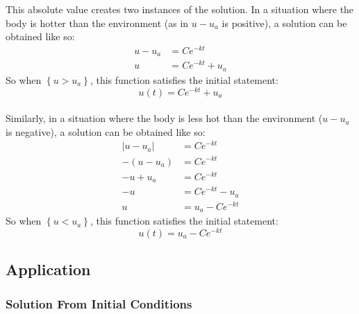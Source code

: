 \documentclass[10pt]{article}
\begin{document}
This absolute value creates two instances of  the solution. In a situation where the body is hotter than the environment (as in $u-u_{a}$ is positive), a solution can be obtained like so:
	\begin{align*}
	u-u_{a} &= Ce^{-kt}\\
	u &= Ce^{-kt}+u_{a}
	\end{align*}
So when $\left \lbrace  u > u_a \right \rbrace $, this function satisfies the initial statement:
	\begin{equation}
	\label{eq:6}
	u(t) = Ce^{-kt}+u_{a}
	\end{equation} \\
Similarly, in a situation where the body is less hot than the environment ($u-u_{a}$ is negative), a solution can be obtained like so:
	\begin{align*}
	\Big| u-u_{a} \Big| &= Ce^{-kt}\\
	-(u- u_{a}) &= Ce^{-kt}\\
	-u+u_{a} &= Ce^{-kt}\\
	-u &= Ce^{-kt}-u_{a}\\
	u &=u_{a}-Ce^{-kt}
	\end{align*}
So when $\left \lbrace  u < u_a \right \rbrace $, this function satisfies the initial statement:
	\begin{equation}
	u(t) =u_{a}-Ce^{-kt}\label{eq:7}
	\end{equation}
\subsection{Application}

\subsubsection{Solution From Initial Conditions}
\end{document}
